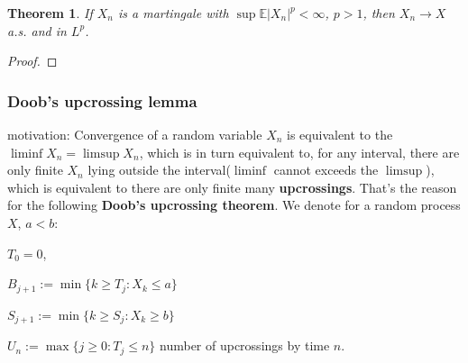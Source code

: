 \documentclass[a4paper,11pt]{book}
\newtheorem{theorem}{Theorem}[section]
\theoremstyle{definition}
\theoremstyle{remark}
\begin{document}
\begin{theorem}
	If $X_n$ is a martingale with $\sup \mathbb{E}|X_n|^p < \infty$, $p > 1$, then $X_n \rightarrow X$ a.s. and in $L^p$.
\end{theorem}
\begin{proof}
	
\end{proof}



\subsubsection{Doob's upcrossing lemma}
motivation:
Convergence of a random variable $X_n$ is equivalent to the $\liminf X_n = \limsup X_n$, which is in turn equivalent to, for any interval, there are only finite $X_n$ lying outside the interval($\liminf$ cannot exceeds the $\limsup$), which is equivalent to there are only finite many \textbf{upcrossings}. That's the reason for the following \textbf{Doob's upcrossing theorem}. We denote for a random process $X$, $a < b$:\par 
$T_0 = 0$,\par
$B_{j + 1}:= \min\{k \geq T_j: X_k \leq a \}$\par 
$S_{j+1}:= \min\{ k \geq S_j: X_k \geq b\}$\par 
$U_n:= \max\{j \geq 0: T_j \leq n\}$ number of upcrossings by time $n$.
\end{document}
